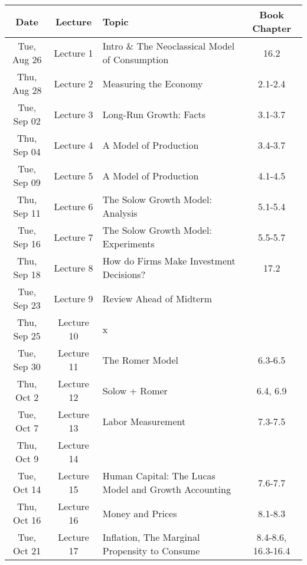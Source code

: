\documentclass[11pt]{article}
\begin{document}
{\begin{center}
	\begin{tabular}{|c|c|l|c|}
		
		\hline \textbf{Date} & \textbf{Lecture} & \textbf{Topic} & \textbf{Book Chapter} \\ \hline
			
		Tue, Aug 26 & Lecture 1 & Intro \& The Neoclassical Model of Consumption &  16.2 \\ \hline
		Thu, Aug 28 & Lecture 2  & Measuring the Economy & 2.1-2.4 \\ \hline
		Tue, Sep 02 & Lecture 3 & Long-Run Growth: Facts & 3.1-3.7 \\ \hline
	    Thu, Sep 04 &Lecture 4 & A Model of Production & 3.4-3.7 \\ \hline	
		Tue, Sep 09 & Lecture 5 & A Model of Production & 4.1-4.5 \\ \hline
		Thu, Sep 11 & Lecture 6 & The Solow Growth Model: Analysis & 5.1-5.4 \\ \hline
		Tue, Sep 16 &  Lecture 7 & The Solow Growth Model: Experiments & 5.5-5.7 \\ \hline
		
		Thu, Sep 18 & Lecture 8 & How do Firms Make Investment Decisions? & 17.2 \\ \hline

		Tue, Sep 23 & Lecture 9 & Review Ahead of Midterm & \textemdash \\ \hline

  	Thu, Sep 25 &  Lecture 10 & x & \textemdash  \\ \hline

        Tue, Sep 30 & Lecture 11 & The Romer Model & 6.3-6.5 \\ \hline

        Thu, Oct 2 & Lecture 12 & Solow + Romer & 6.4, 6.9 \\ \hline

        Tue, Oct 7 & Lecture 13 & Labor Measurement &  7.3-7.5 \\ \hline

        Thu, Oct 9 & Lecture 14  &  \textbf{ } &   \\ \hline

        Tue, Oct 14 & Lecture 15 & Human Capital: The Lucas Model and Growth Accounting &7.6-7.7  \\ \hline
        Thu, Oct 16 & Lecture 16 & Money and Prices &8.1-8.3  \\ \hline
		
        Tue,  Oct 21 & Lecture 17 & Inflation, The Marginal Propensity to Consume & 8.4-8.6, 16.3-16.4 \\ \hline


\end{tabular}
\end{center}}
\end{document}
